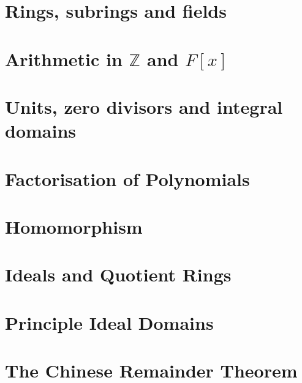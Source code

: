 \documentclass[a4paper,12pt]{report}
\begin{document}
\maketitle
\tableofcontents
\setcounter{section}{0}


\chapter{Rings, subrings and fields}

\chapter{Arithmetic in \(\mathbb{Z}\) and \(F[x]\)}

\chapter{Units, zero divisors and integral domains}

\chapter{Factorisation of Polynomials}

\chapter{Homomorphism}

\chapter{Ideals and Quotient Rings}

\chapter{Principle Ideal Domains}

\chapter{The Chinese Remainder Theorem}
\end{document}
